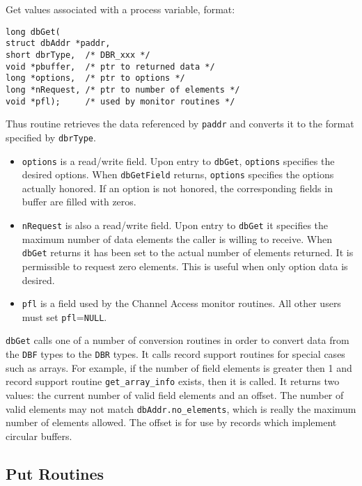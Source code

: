 Get values associated with a process variable, format:

\begin{verbatim}long dbGet(
struct dbAddr *paddr,
short dbrType,  /* DBR_xxx */
void *pbuffer,  /* ptr to returned data */
long *options,  /* ptr to options */
long *nRequest, /* ptr to number of elements */
void *pfl);     /* used by monitor routines */
\end{verbatim}Thus routine retrieves the data referenced by \verb|paddr| and converts it to the format specified by \verb|dbrType|. 

\begin{itemize}\item \verb|options| is a read/write field. Upon entry to \verb|dbGet|, \verb|options| specifies the desired options. When 
\verb|dbGetField| returns, \verb|options| specifies the options actually honored. If an option is not honored, the 
corresponding fields in buffer are filled with zeros.

\item \verb|nRequest| is also a read/write field. Upon entry to \verb|dbGet| it specifies the maximum number of data elements the 
caller is willing to receive. When \verb|dbGet| returns it has been set to the actual number of elements returned. It is 
permissible to request zero elements. This is useful when only option data is desired.

\item \verb|pfl| is a field used by the Channel Access monitor routines. All other users must set \verb|pfl|=\verb|NULL|.

\end{itemize}\verb|dbGet| calls one of a number of conversion routines in order to convert data from the \verb|DBF| types to the \verb|DBR| types. It calls 
record support routines for special cases such as arrays. For example, if the number of field elements is greater then 1 and 
record support routine \verb|get_array_info| exists, then it is called. It returns two values: the current number of valid field 
elements and an offset. The number of valid elements may not match \verb|dbAddr.no_elements|, which is really the 
maximum number of elements allowed. The offset is for use by records which implement circular buffers.

\subsection{Put Routines}

